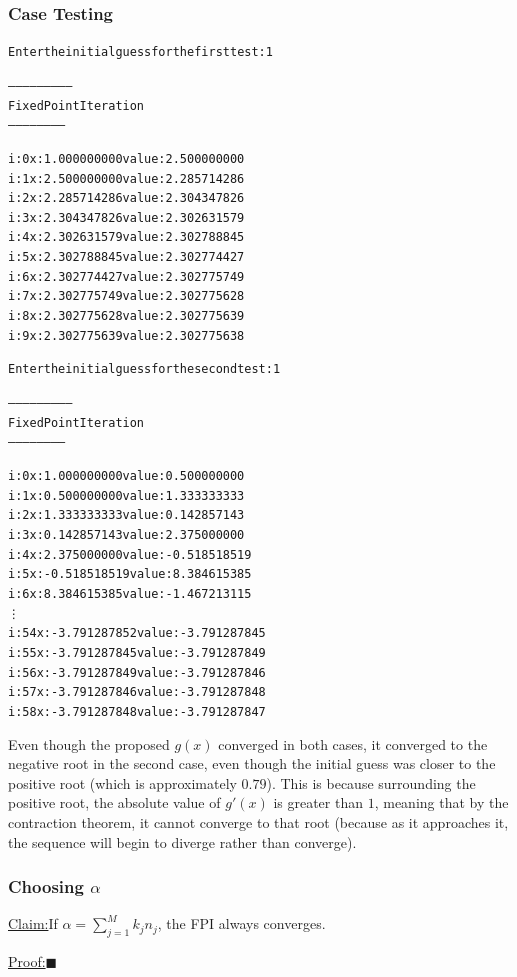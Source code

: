 \documentclass[11pt]{article} %
\newenvironment{claim}[1]{\par\noindent\underline{Claim:}\space#1}{}
\newenvironment{proof}[1]{\par\noindent\underline{Proof:}\space#1}{\hfill $\blacksquare$}
\begin{document}
\subsubsection*{Case Testing}
\begin{alltt}
Enter the initial guess for the first test: 1 

--------------------------
 Fixed Point Iteration
 -----------------------


i: 0	x: 1.000000000	value: 2.500000000
i: 1	x: 2.500000000	value: 2.285714286
i: 2	x: 2.285714286	value: 2.304347826
i: 3	x: 2.304347826	value: 2.302631579
i: 4	x: 2.302631579	value: 2.302788845
i: 5	x: 2.302788845	value: 2.302774427
i: 6	x: 2.302774427	value: 2.302775749
i: 7	x: 2.302775749	value: 2.302775628
i: 8	x: 2.302775628	value: 2.302775639
i: 9	x: 2.302775639	value: 2.302775638

Enter the initial guess for the second test:  1

--------------------------
 Fixed Point Iteration
 -----------------------


i: 0	x: 1.000000000	value: 0.500000000
i: 1	x: 0.500000000	value: 1.333333333
i: 2	x: 1.333333333	value: 0.142857143
i: 3	x: 0.142857143	value: 2.375000000
i: 4	x: 2.375000000	value: -0.518518519
i: 5	x: -0.518518519	value: 8.384615385
i: 6	x: 8.384615385	value: -1.467213115
\vdots
i: 54	x: -3.791287852	value: -3.791287845
i: 55	x: -3.791287845	value: -3.791287849
i: 56	x: -3.791287849	value: -3.791287846
i: 57	x: -3.791287846	value: -3.791287848
i: 58	x: -3.791287848	value: -3.791287847
\end{alltt}
\par Even though the proposed $g(x)$ converged in both cases, it converged to the negative root in the second case, even though the initial guess
was closer to the positive root (which is approximately $0.79$). This is because surrounding the positive root, the absolute value of $g'(x)$ is greater than $1$, meaning that by the contraction theorem, it cannot converge to that root (because as it approaches it, the sequence will begin to diverge rather than converge).

\subsubsection*{Choosing $\alpha$}


\begin{claim}
If $\alpha  = \sum_{j=1}^M k_jn_j$, the FPI always converges.
\end{claim}
\begin{proof}
\end{proof}
\end{document}
